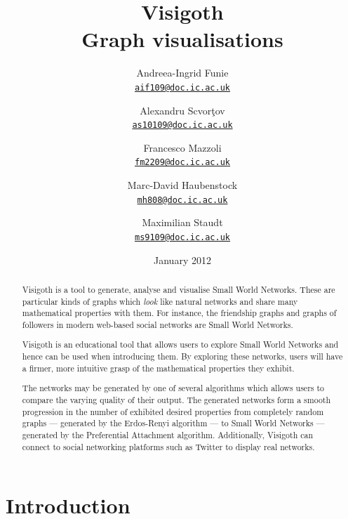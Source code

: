 \documentclass[a4paper,11pt,titlepage]{article}
\let\stdhref\href
\renewcommand{\href}[2]{\stdhref{#1}{\texttt{#2}}}
\newcommand{\mailto}[1]{\href{mailto:#1}{#1}}
\let\stdsection\section         %
\renewcommand{\section}{\newpage\stdsection}
\begin{document}
\title{\Huge Visigoth\\\Large Graph visualisations}
\author{
  Andreea-Ingrid Funie\\\mailto{aif109@doc.ic.ac.uk}\and
  Alexandru Scvor\c tov\\\mailto{as10109@doc.ic.ac.uk}\and
  Francesco Mazzoli\\\mailto{fm2209@doc.ic.ac.uk}\and
  Marc-David Haubenstock\\\mailto{mh808@doc.ic.ac.uk}\and
  Maximilian Staudt\\\mailto{ms9109@doc.ic.ac.uk}
}
\date{January 2012}
\maketitle

\begin{abstract}

Visigoth is a tool to generate, analyse and visualise Small World
Networks. These are particular kinds of graphs which \emph{look} like
natural networks and share many mathematical properties with them.
For instance, the friendship graphs and graphs of followers in modern
web-based social networks are Small World Networks.

Visigoth is an educational tool that allows users to explore Small
World Networks and hence can be used when introducing them. By
exploring these networks, users will have a firmer, more intuitive
grasp of the mathematical properties they exhibit.

The networks may be generated by one of several algorithms which
allows users to compare the varying quality of their output. The
generated networks form a smooth progression in the number of
exhibited desired properties from completely random graphs ---
generated by the Erdos-Renyi algorithm --- to Small World Networks ---
generated by the Preferential Attachment algorithm. Additionally,
Visigoth can connect to social networking platforms such as Twitter to
display real networks.
\end{abstract}

\tableofcontents




\section{Introduction}

\end{document}
